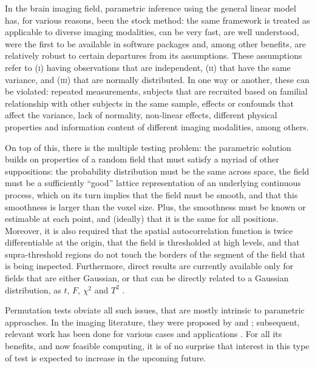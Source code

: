 In the brain imaging field, parametric inference using the general linear model \citep[\textsc{glm};][]{Scheffe1959, Searle1971, Friston1994} has, for various reasons, been the stock method: the same framework is treated as applicable to diverse imaging modalities, can be very fast, are well understood, were the first to be available in software packages and, among other benefits, are relatively robust to certain departures from its assumptions. These assumptions refer to (\textsc{i}) having observations that are independent, (\textsc{ii}) that have the same variance, and (\textsc{iii}) that are normally distributed. In one way or another, these can be violated: repeated measurements, subjects that are recruited based on familial relationship with other subjects in the same sample, effects or confounds that affect the variance, lack of normality, non-linear effects, different physical properties and information content of different imaging modalities, among others.

On top of this, there is the multiple testing problem: the parametric solution builds on properties of a random field that must satisfy a myriad of other suppositions: the probability distribution must be the same across space, the field must be a sufficiently ``good'' lattice representation of an underlying continuous process, which on its turn implies that the field must be smooth, and that this smoothness is larger than the voxel size. Plus, the smoothness must be known or estimable at each point, and (ideally) that it is the same for all positions. Moreover, it is also required that the spatial autocorrelation function is twice differentiable at the origin, that the field is thresholded at high levels, and that supra-threshold regions do not touch the borders of the segment of the field that is being inspected. Furthermore, direct results are currently available only for fields that are either Gaussian, or that can be directly related to a Gaussian distribution, as $t$, $F$, $\chi^2$ and $T^2$ \citep{Worsley1996}.

Permutation tests obviate all such issues, that are mostly intrinsic to parametric approaches. In the imaging literature, they were proposed by \citet{blair1994_thatcher} and \citet{Holmes1996}; subsequent, relevant work has been done for various cases and applications \citep{Arndt1996, Locascio1997, Brammer1997, Belmonte2001, Bullmore1996, Bullmore1999, Bullmore2001, Nichols2002, Breakspear2004, Laird2004, Suckling2004, Hayasaka2004, Meriaux2006, Eklund2012, Ge2012, Winkler2014, Winkler2016_npc, McFarquhar2016}. For all its benefits, and now feasible computing, it is of no surprise that interest in this type of test is expected to increase in the upcoming future.

